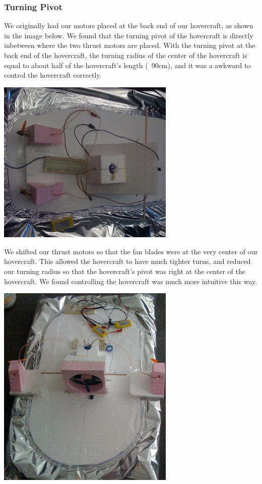 \subsubsection{Turning Pivot}
We originally had our motors placed at the back end of our hovercraft, as shown in the image below. We found that the turning pivot of the hovercraft is directly inbetween where the two thrust motors are placed. With the turning pivot at the back end of the hovercraft, the turning radius of the center of the hovercraft is equal to about half of the hovercraft's length (~90cm), and it was a awkward to control the hovercraft correctly. 

\begin{center}
  \includegraphics[width=85mm]{imageSources/turningPivot1.png}
\end{center}
\label{turningPivot1}

We shifted our thrust motors so that the fan blades were at the very center of our hovercraft. This allowed the hovercraft to have much tighter turns, and reduced our turning radius so that the hovercraft's pivot was right at the center of the hovercraft. We found controlling the hovercraft was much more intuitive this way.

\begin{center}
  \includegraphics[width=85mm]{imageSources/turningPivot2.png}
\end{center}
\label{turningPivot2}

